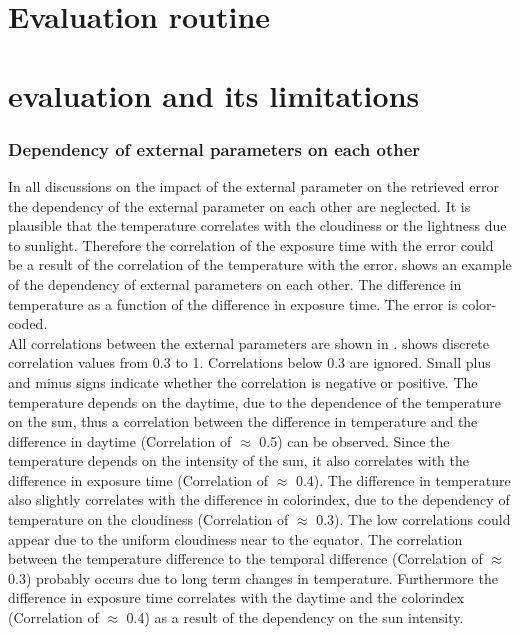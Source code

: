 \documentclass  [
  paper    = a4,
  BCOR     = 10mm,
  twoside,
  fontsize = 12pt,
  fleqn,
  toc      = bibnumbered,
  toc      = listofnumbered,
  numbers  = noendperiod,
  headings = normal,
  listof   = leveldown,
  version  = 3.03
]                                       {scrreprt}
\begin{document}
	\chapter{Evaluation routine}
	
	\chapter{  evaluation and its limitations}
	
	

	\subsection*{Dependency of external parameters on each other}
	In all discussions on the impact of the external parameter on the retrieved   error the  dependency of the external parameter on each other are neglected. It is plausible that the temperature correlates with the cloudiness or the lightness due to sunlight. Therefore the correlation of the exposure time with the   error could be a result of the correlation of the temperature with the   error.  shows an example of the dependency of external parameters on each other. The difference in temperature as a function of the difference in exposure time. The   error is color-coded. \\
	All correlations between the external parameters are shown in .  shows discrete correlation values from 0.3 to 1. Correlations below 0.3 are ignored. Small plus and minus signs indicate whether the correlation is negative or positive. 
	The temperature depends on the daytime, due to the dependence of the temperature on the sun, thus a correlation between the  difference in temperature and the difference in daytime (Correlation of $\approx$ 0.5) can be observed. Since the temperature depends on the intensity of the sun, it also correlates with  the difference in exposure time (Correlation of $\approx$ 0.4). The difference in temperature also slightly correlates with the difference in colorindex, due to the dependency of temperature on the cloudiness (Correlation of $\approx$ 0.3). The low correlations could appear due to the uniform cloudiness near to the equator. The correlation between the temperature difference to the temporal difference (Correlation of $\approx$ 0.3) probably occurs due to long term changes in temperature. Furthermore the difference in exposure time correlates with the daytime and the colorindex (Correlation of $\approx$ 0.4) as a result of the dependency on the sun intensity.\\
\end{document}
